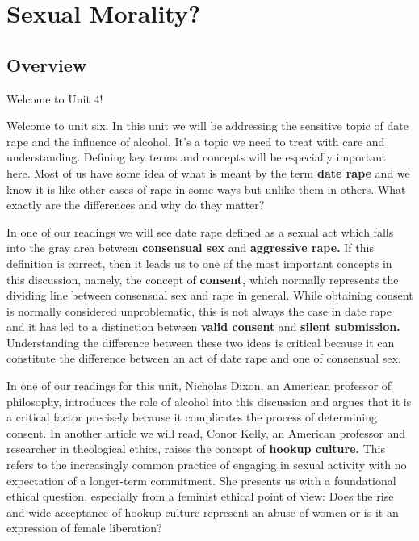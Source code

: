 \documentclass[
]{book}
\begin{document}
\hypertarget{sexual-morality}{%
\chapter{Sexual Morality?}\label{sexual-morality}}

\hypertarget{overview-3}{%
\section*{Overview}\label{overview-3}}

Welcome to Unit 4!

Welcome to unit six. In this unit we will be addressing the sensitive topic of date rape and the influence of alcohol. It's a topic we need to treat with care and understanding. Defining key terms and concepts will be especially important here. Most of us have some idea of what is meant by the term \textbf{date rape} and we know it is like other cases of rape in some ways but unlike them in others. What exactly are the differences and why do they matter?

In one of our readings we will see date rape defined as a sexual act which falls into the gray area between \textbf{consensual sex} and \textbf{aggressive rape.} If this definition is correct, then it leads us to one of the most important concepts in this discussion, namely, the concept of \textbf{consent,} which normally represents the dividing line between consensual sex and rape in general. While obtaining consent is normally considered unproblematic, this is not always the case in date rape and it has led to a distinction between \textbf{valid consent} and \textbf{silent submission.} Understanding the difference between these two ideas is critical because it can constitute the difference between an act of date rape and one of consensual sex.

In one of our readings for this unit, Nicholas Dixon, an American professor of philosophy, introduces the role of alcohol into this discussion and argues that it is a critical factor precisely because it complicates the process of determining consent. In another article we will read, Conor Kelly, an American professor and researcher in theological ethics, raises the concept of \textbf{hookup culture.} This refers to the increasingly common practice of engaging in sexual activity with no expectation of a longer-term commitment. She presents us with a foundational ethical question, especially from a feminist ethical point of view: Does the rise and wide acceptance of hookup culture represent an abuse of women or is it an expression of female liberation?
\end{document}
